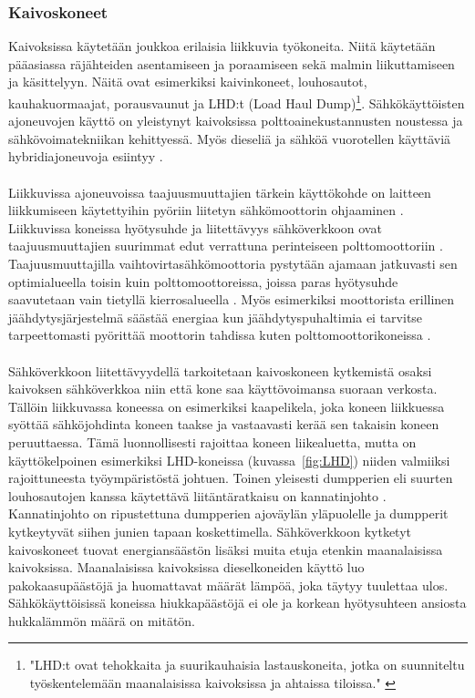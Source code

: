 \documentclass[finnish,12pt,a4paper,pdftex,elec,utf8]{aaltothesis}
\begin{document}
\subsubsection{Kaivoskoneet}
Kaivoksissa käytetään joukkoa erilaisia liikkuvia työkoneita. Niitä käytetään pääasiassa räjähteiden asentamiseen ja poraamiseen sekä malmin liikuttamiseen ja käsittelyyn. Näitä ovat esimerkiksi kaivinkoneet, louhosautot, kauhakuormaajat, porausvaunut ja LHD:t (Load Haul Dump)\footnote{"LHD:t ovat tehokkaita ja suurikauhaisia lastauskoneita, jotka on suunniteltu työskentelemään maanalaisissa kaivoksissa ja ahtaissa tiloissa." \cite[s. 192]{Hakapää}}. Sähkökäyttöisten ajoneuvojen käyttö on yleistynyt kaivoksissa polttoainekustannusten noustessa ja sähkövoimatekniikan kehittyessä. Myös dieseliä ja sähköä vuorotellen käyttäviä hybridiajoneuvoja esiintyy \cite{Brown}.
\\\\
Liikkuvissa ajoneuvoissa taajuusmuuttajien tärkein käyttökohde on laitteen liikkumiseen käytettyihin pyöriin liitetyn sähkömoottorin ohjaaminen \cite{Brown}. Liikkuvissa koneissa hyötysuhde ja liitettävyys sähköverkkoon ovat taajuusmuuttajien suurimmat edut verrattuna perinteiseen polttomoottoriin \cite{Brown}. Taajuusmuuttajilla vaihtovirtasähkömoottoria pystytään ajamaan jatkuvasti sen optimialueella toisin kuin polttomoottoreissa, joissa paras hyötysuhde saavutetaan vain tietyllä kierrosalueella \cite{Brown}. Myös esimerkiksi moottorista erillinen jäähdytysjärjestelmä säästää energiaa kun jäähdytyspuhaltimia ei tarvitse tarpeettomasti pyörittää moottorin tahdissa kuten polttomoottorikoneissa \cite{Brown}. 
\\\\
Sähköverkkoon liitettävyydellä tarkoitetaan kaivoskoneen kytkemistä osaksi kaivoksen sähköverkkoa niin että kone saa käyttövoimansa suoraan verkosta. Tällöin liikkuvassa koneessa on  esimerkiksi kaapelikela, joka koneen liikkuessa syöttää sähköjohdinta koneen taakse ja vastaavasti kerää sen takaisin koneen peruuttaessa. Tämä luonnollisesti rajoittaa koneen liikealuetta, mutta on käyttökelpoinen esimerkiksi LHD-koneissa (kuvassa~\ref{fig:LHD}) niiden valmiiksi rajoittuneesta työympäristöstä johtuen. Toinen yleisesti dumpperien eli suurten louhosautojen kanssa käytettävä liitäntäratkaisu on kannatinjohto \cite{Brown}. Kannatinjohto on ripustettuna dumpperien ajoväylän yläpuolelle ja dumpperit kytkeytyvät siihen junien tapaan koskettimella. Sähköverkkoon kytketyt kaivoskoneet tuovat energiansäästön lisäksi muita etuja etenkin maanalaisissa kaivoksissa. Maanalaisissa kaivoksissa dieselkoneiden käyttö luo pakokaasupäästöjä ja huomattavat määrät lämpöä, joka täytyy tuulettaa ulos. Sähkökäyttöisissä koneissa hiukkapäästöjä ei ole ja korkean hyötysuhteen ansiosta hukkalämmön määrä on mitätön.
\end{document}
